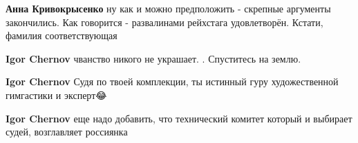 \begin{itemize}
\begin{itemize}
\textbf{Анна Кривокрысенко} ну как и можно предположить - скрепные аргументы закончились. Как говорится - развалинами рейхстага удовлетворён. Кстати, фамилия соответствующая

 
\textbf{Igor Chernov} чванство никого не украшает. . Спуститесь на землю.

 
\textbf{Igor Chernov} Судя по твоей комплекции, ты истинный гуру художественной гимгастики и эксперт😂

 
\textbf{Igor Chernov} еще надо добавить, что технический комитет который и выбирает судей, возглавляет россиянка


\end{itemize}

\end{itemize}

